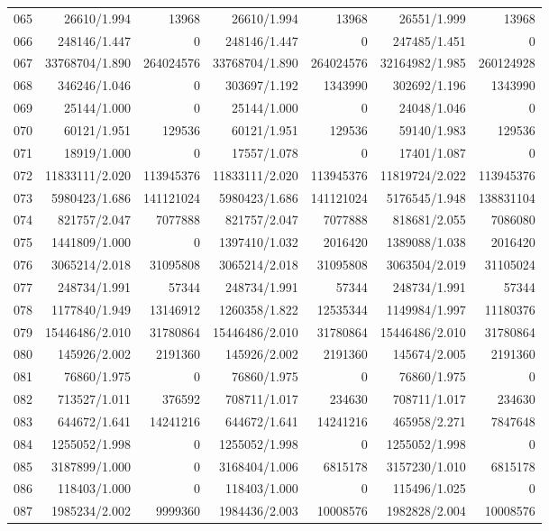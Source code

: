 \begin{longtable}{crrrrrr}
065 & 26610/1.994 & 13968 & 26610/1.994 & 13968 & 26551/1.999 & 13968 \\
066 & 248146/1.447 & 0 & 248146/1.447 & 0 & 247485/1.451 & 0 \\
067 & 33768704/1.890 & 264024576 & 33768704/1.890 & 264024576 & 32164982/1.985 & 260124928 \\
068 & 346246/1.046 & 0 & 303697/1.192 & 1343990 & 302692/1.196 & 1343990 \\
069 & 25144/1.000 & 0 & 25144/1.000 & 0 & 24048/1.046 & 0 \\
070 & 60121/1.951 & 129536 & 60121/1.951 & 129536 & 59140/1.983 & 129536 \\
071 & 18919/1.000 & 0 & 17557/1.078 & 0 & 17401/1.087 & 0 \\
072 & 11833111/2.020 & 113945376 & 11833111/2.020 & 113945376 & 11819724/2.022 & 113945376 \\
073 & 5980423/1.686 & 141121024 & 5980423/1.686 & 141121024 & 5176545/1.948 & 138831104 \\
074 & 821757/2.047 & 7077888 & 821757/2.047 & 7077888 & 818681/2.055 & 7086080 \\
075 & 1441809/1.000 & 0 & 1397410/1.032 & 2016420 & 1389088/1.038 & 2016420 \\
076 & 3065214/2.018 & 31095808 & 3065214/2.018 & 31095808 & 3063504/2.019 & 31105024 \\
077 & 248734/1.991 & 57344 & 248734/1.991 & 57344 & 248734/1.991 & 57344 \\
078 & 1177840/1.949 & 13146912 & 1260358/1.822 & 12535344 & 1149984/1.997 & 11180376 \\
079 & 15446486/2.010 & 31780864 & 15446486/2.010 & 31780864 & 15446486/2.010 & 31780864 \\
080 & 145926/2.002 & 2191360 & 145926/2.002 & 2191360 & 145674/2.005 & 2191360 \\
081 & 76860/1.975 & 0 & 76860/1.975 & 0 & 76860/1.975 & 0 \\
082 & 713527/1.011 & 376592 & 708711/1.017 & 234630 & 708711/1.017 & 234630 \\
083 & 644672/1.641 & 14241216 & 644672/1.641 & 14241216 & 465958/2.271 & 7847648 \\
084 & 1255052/1.998 & 0 & 1255052/1.998 & 0 & 1255052/1.998 & 0 \\
085 & 3187899/1.000 & 0 & 3168404/1.006 & 6815178 & 3157230/1.010 & 6815178 \\
086 & 118403/1.000 & 0 & 118403/1.000 & 0 & 115496/1.025 & 0 \\
087 & 1985234/2.002 & 9999360 & 1984436/2.003 & 10008576 & 1982828/2.004 & 10008576 \\

\end{longtable}

